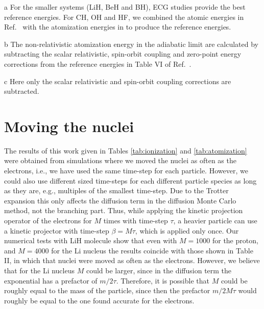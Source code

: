 \documentclass[pra,superscriptaddress,groupedaddress,twocolumn]{revtex4}
\begin{document}
\begin{table}[t!]
\begin{threeparttable}
\begin{tabular*}{\textwidth}{@{\extracolsep{\fill}} cccccccc}
\hline\hline
\end{tabular*}
\begin{tablenotes}
\item[a] For the smaller systems (LiH, BeH and BH), ECG studies provide the best reference energies. For CH, OH and HF, we combined the atomic energies in Ref.~\cite{Davidson_Atoms} with the atomization energies in \cite{Feller_Corrections} to produce the reference energies.
\item[b] The non-relativistic atomization energy in the adiabatic limit are calculated by subtracting the scalar relativistic, spin-orbit coupling and zero-point energy corrections from the reference energies in Table VI of Ref.~\cite{Feller_Corrections}.
\item[c] Here only the scalar relativistic and spin-orbit coupling corrections are subtracted.
\end{tablenotes}
\end{threeparttable}
\end{table} 


\section{Moving the nuclei}
The results of this work given in Tables \ref{tab:ionization} and \ref{tab:atomization} were obtained from simulations where we moved the nuclei as often as the electrons, i.e., we have used the same time-step for each particle. However, we could also use different sized time-steps for each different particle species as long as they are, e.g., multiples of the smallest time-step. Due to the Trotter expansion \cite{Trotter} this only affects the diffusion term in the diffusion Monte Carlo method, not the branching part. Thus, while applying the kinetic projection operator of the electrons for $M$ times with time-step $\tau$, a heavier particle can use a kinetic projector with time-step $\beta=M\tau$, which is applied only once. Our numerical tests with LiH molecule show that even with $M=1000$ for the proton, and $M=4000$ for the Li nucleus the results coincide with those shown in Table II, in which that nuclei were moved as often as the electrons. However, we believe that for the Li nucleus $M$ could be larger, since in the diffusion term the exponential has a prefactor of $m/2\tau$. Therefore, it is possible that $M$ could be roughly equal to the mass of the particle, since then the prefactor $m/2M\tau$ would roughly be equal to the one found accurate for the electrons.
\end{document}
